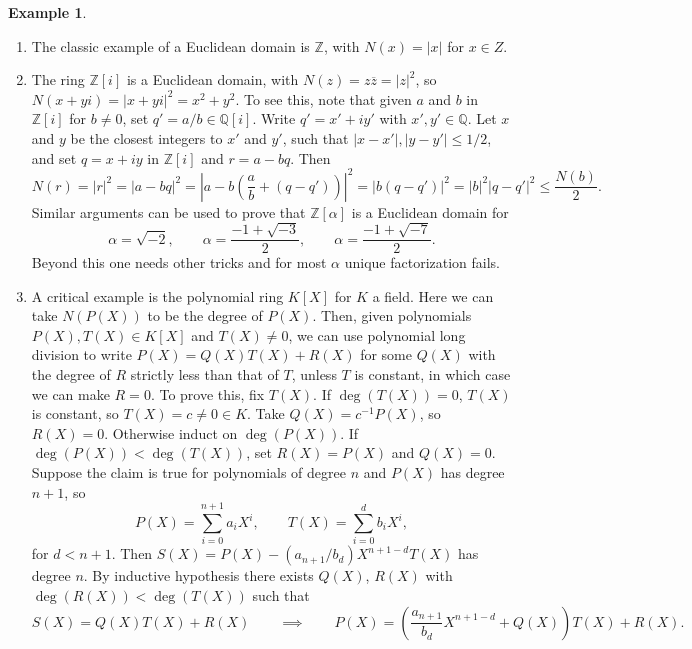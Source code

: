 \documentclass{article}
\newcommand{\Z}{\mathbb{Z}}
\newcommand{\Q}{\mathbb{Q}}
\newcommand{\rb}[1]{\left( #1 \right)}
\renewcommand{\sb}[1]{\left[ #1 \right]}
\newcommand{\abs}[1]{\left\lvert #1 \right\rvert}
\theoremstyle{definition}\newtheorem{definition}{Definition}[section]
\theoremstyle{definition}\newtheorem{remark}[definition]{Remark}
\theoremstyle{definition}\newtheorem*{example}{Example}
\theoremstyle{definition}\newtheorem*{note}{Note}
\begin{document}
\begin{example}
\hfill
\begin{enumerate}
\item The classic example of a Euclidean domain is $ \Z $, with $ N\rb{x} = \abs{x} $ for $ x \in Z $.
\item The ring $ \Z\sb{i} $ is a Euclidean domain, with $ N\rb{z} = z\overline{z} = \abs{z}^2 $, so $ N\rb{x + yi} = \abs{x + yi}^2 = x^2 + y^2 $. To see this, note that given $ a $ and $ b $ in $ \Z\sb{i} $ for $ b \ne 0 $, set $ q' = a / b \in \Q\sb{i} $. Write $ q' = x' + iy' $ with $ x', y' \in \Q $. Let $ x $ and $ y $ be the closest integers to $ x' $ and $ y' $, such that $ \abs{x - x'}, \abs{y - y'} \le 1 / 2 $, and set $ q = x + iy $ in $ \Z\sb{i} $ and $ r = a - bq $. Then
$$ N\rb{r} = \abs{r}^2 = \abs{a - bq}^2 = \abs{a - b\rb{\dfrac{a}{b} + \rb{q - q'}}}^2 = \abs{b\rb{q - q'}}^2 = \abs{b}^2\abs{q - q'}^2 \le \dfrac{N\rb{b}}{2}. $$
Similar arguments can be used to prove that $ \Z\sb{\alpha} $ is a Euclidean domain for
$$ \alpha = \sqrt{-2}, \qquad \alpha = \dfrac{-1 + \sqrt{-3}}{2}, \qquad \alpha = \dfrac{-1 + \sqrt{-7}}{2}. $$
Beyond this one needs other tricks and for most $ \alpha $ unique factorization fails.
\item A critical example is the polynomial ring $ K\sb{X} $ for $ K $ a field. Here we can take $ N\rb{P\rb{X}} $ to be the degree of $ P\rb{X} $. Then, given polynomials $ P\rb{X}, T\rb{X} \in K\sb{X} $ and $ T\rb{X} \ne 0 $, we can use polynomial long division to write $ P\rb{X} = Q\rb{X}T\rb{X} + R\rb{X} $ for some $ Q\rb{X} $ with the degree of $ R $ strictly less than that of $ T $, unless $ T $ is constant, in which case we can make $ R = 0 $. To prove this, fix $ T\rb{X} $. If $ \deg\rb{T\rb{X}} = 0 $, $ T\rb{X} $ is constant, so $ T\rb{X} = c \ne 0 \in K $. Take $ Q\rb{X} = c^{-1}P\rb{X} $, so $ R\rb{X} = 0 $. Otherwise induct on $ \deg\rb{P\rb{X}} $. If $ \deg\rb{P\rb{X}} < \deg\rb{T\rb{X}} $, set $ R\rb{X} = P\rb{X} $ and $ Q\rb{X} = 0 $. Suppose the claim is true for polynomials of degree $ n $ and $ P\rb{X} $ has degree $ n + 1 $, so
$$ P\rb{X} = \sum_{i = 0}^{n + 1} a_iX^i, \qquad T\rb{X} = \sum_{i = 0}^d b_iX^i, $$
for $ d < n + 1 $. Then $ S\rb{X} = P\rb{X} - \rb{a_{n + 1} / b_d}X^{n + 1 - d}T\rb{X} $ has degree $ n $. By inductive hypothesis there exists $ Q\rb{X} $, $ R\rb{X} $ with $ \deg\rb{R\rb{X}} < \deg\rb{T\rb{X}} $ such that
$$ S\rb{X} = Q\rb{X}T\rb{X} + R\rb{X} \qquad \implies \qquad P\rb{X} = \rb{\dfrac{a_{n + 1}}{b_d}X^{n + 1 - d} + Q\rb{X}}T\rb{X} + R\rb{X}. $$
\end{enumerate}
\end{example}
\end{document}
